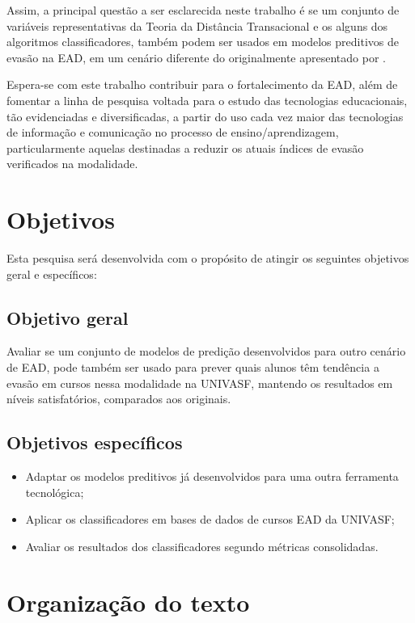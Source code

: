 Assim, a principal questão a ser esclarecida neste trabalho é se um conjunto de variáveis
representativas da Teoria da Distância Transacional e os alguns dos algoritmos classificadores, 
também podem ser usados em modelos preditivos de evasão na EAD, em um cenário diferente 
do originalmente apresentado por .

Espera-se com este trabalho contribuir para o fortalecimento da EAD, além de
fomentar a linha de pesquisa voltada para o estudo das tecnologias educacionais,
tão evidenciadas e diversificadas, a partir do uso cada vez maior das
tecnologias de informação e comunicação no processo de ensino/aprendizagem, particularmente
aquelas destinadas a reduzir os atuais índices de evasão verificados na modalidade.

\section{Objetivos}

Esta pesquisa será desenvolvida com o propósito de atingir os seguintes
objetivos geral e específicos:

\subsection{Objetivo geral}

Avaliar se um conjunto de modelos de predição desenvolvidos para outro cenário
de EAD, pode também ser usado para prever quais alunos têm tendência a evasão em
cursos nessa modalidade na UNIVASF, mantendo os resultados em níveis
satisfatórios, comparados aos originais.

\subsection{Objetivos específicos}
\begin{itemize}
  \item Adaptar os modelos preditivos já desenvolvidos para uma outra ferramenta
  tecnológica;
  \item Aplicar os classificadores em bases de dados de cursos EAD da UNIVASF;
  \item Avaliar os resultados dos classificadores segundo métricas consolidadas.
\end{itemize}

\section{Organização do texto}

